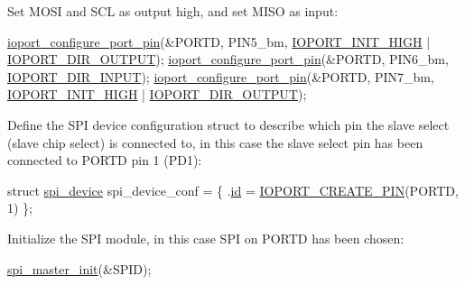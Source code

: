 \begin{DoxyEnumerate}
\begin{DoxyEnumerate}
\item Set M\-O\-S\-I and S\-C\-L as output high, and set M\-I\-S\-O as input\-: 
\begin{DoxyCode}
        \hyperlink{ioport__compat_8h_a8da4959022f2cec05f59a9939671ff7e}{ioport\_configure\_port\_pin}(&PORTD, PIN5\_bm, 
      \hyperlink{ioport__compat_8h_a6fd5b83fc296e4d6d791f8b074731d8e}{IOPORT\_INIT\_HIGH} | \hyperlink{group__ioport__group_gga9c267f89800e58bd9dfd74e662a4a4c1a06de24313dad0169f3a366c62a84f4cc}{IOPORT\_DIR\_OUTPUT});
        \hyperlink{ioport__compat_8h_a8da4959022f2cec05f59a9939671ff7e}{ioport\_configure\_port\_pin}(&PORTD, PIN6\_bm, 
      \hyperlink{group__ioport__group_gga9c267f89800e58bd9dfd74e662a4a4c1af854a0dce084e5a8e8744f9a502e7b7b}{IOPORT\_DIR\_INPUT});
        \hyperlink{ioport__compat_8h_a8da4959022f2cec05f59a9939671ff7e}{ioport\_configure\_port\_pin}(&PORTD, PIN7\_bm, 
      \hyperlink{ioport__compat_8h_a6fd5b83fc296e4d6d791f8b074731d8e}{IOPORT\_INIT\_HIGH} | \hyperlink{group__ioport__group_gga9c267f89800e58bd9dfd74e662a4a4c1a06de24313dad0169f3a366c62a84f4cc}{IOPORT\_DIR\_OUTPUT});
\end{DoxyCode}

\end{DoxyEnumerate}
\item Define the S\-P\-I device configuration struct to describe which pin the slave select (slave chip select) is connected to, in this case the slave select pin has been connected to P\-O\-R\-T\-D pin 1 (P\-D1)\-:
\begin{DoxyItemize}
\item 
\begin{DoxyCode}
        \textcolor{keyword}{struct }\hyperlink{structspi__device}{spi\_device} spi\_device\_conf = \{
            .\hyperlink{structspi__device_a46fd65e51a4d6c4d6056639a4f154186}{id} = \hyperlink{group__ioport__group_gabc09edad7c3187dec63ce47e6f1b3c51}{IOPORT\_CREATE\_PIN}(PORTD, 1)
        \};
\end{DoxyCode}

\end{DoxyItemize}
\item Initialize the S\-P\-I module, in this case S\-P\-I on P\-O\-R\-T\-D has been chosen\-:
\begin{DoxyItemize}
\item 
\begin{DoxyCode}
        \hyperlink{group__xmega__spi__master__group_ga3238676989038a9dec0ebcd3aa625a42}{spi\_master\_init}(&SPID);
\end{DoxyCode}


\end{DoxyItemize}
\end{DoxyEnumerate}
